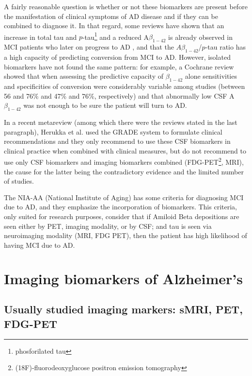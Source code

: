 \documentclass[a4paper,12pt]{elsarticle}  %
\begin{document}
  A fairly reasonable question is whether or not these biomarkers are present before the manifestation of clinical symptoms of AD disease and if they can be combined to diagnose it. In that regard, some reviews have shown that an increase in total tau and $p$-tau\footnote{phosforilated tau} and a reduced A$\beta_{1-42}$ is already observed in MCI patients who later on progress to AD \cite{Diniz2008172, Olsson2016673}, and that the $A\beta_{1-42}$/$p$-tau ratio has a high capacity of predicting conversion from MCI to AD\cite{Ferreira2014}. However, isolated biomarkers have not found the same pattern: for example, a Cochrane review showed that when assessing the predictive capacity of $\beta_{1-42}$ alone sensitivities and specificities of conversion were considerably variable among studies (between 56 and 76\% and 47\% and 76\%, respectively) and that abnormally low CSF A$\beta_{1-42}$ was not enough to be sure the patient will turn to AD.
  
  In a recent metareview (among which there were the reviews stated in the last paragraph), Herukka et al.\cite{Herukka2017285} used the GRADE system to formulate clinical recommendations and they only recommend to use these CSF biomarkers in clinical practice when combined with clinical measures, but do not recommend to use only CSF biomarkers and imaging biomarkers combined (FDG-PET\footnote{(18F)‐fluorodeoxyglucose positron emission tomography}, MRI), the cause for the latter being the contradictory evidence and the limited number of studies.
  
  The NIA-AA (National Institute of Aging) has some criteria for diagnosing MCI due to AD, and they emphasize the incorporation of biomarkers\cite{Liu201856}. This criteria, only suited for research purposes, consider that if Amiloid Beta depositions are seen either by PET, imaging modality, or by CSF; and tau is seen via neuroimaging modality (MRI, FDG PET), then the patient has high likelihood of having MCI due to AD\cite{Liu201856}.  
  
\section{Imaging biomarkers of Alzheimer's}


  	\subsection{Usually studied imaging markers: sMRI, PET, FDG-PET}
  	
\end{document}
